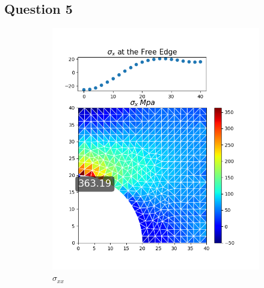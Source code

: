 \documentclass[twoside,twocolumn,10pt]{article}
\begin{document}
\subsection{Question 5}
\begin{figure}[!ht]
  \begin{subfigure}[c]{0.26\textwidth}
    \includegraphics[width=1.\linewidth]{Q2_5/Q5_1_x_triangle.png}
    \caption{$\sigma_{xx}$}
    \label{fig:x_tri_1}
  \end{subfigure}%
  \begin{subfigure}[c]{0.26\textwidth}

\end{subfigure}
\end{figure}
\end{document}
